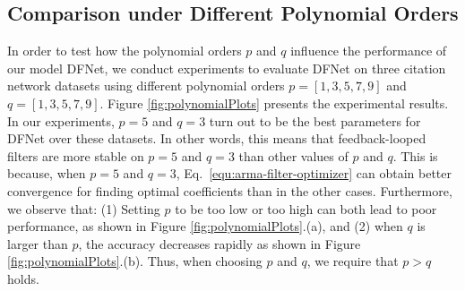 \documentclass{article}
\begin{document}
\begin{comment}
\begin{figure}[h]
    \centering
    \fbox{\texttt{[image: images/cut-off\_plots/ARMA-Dense.png]}}
    \fbox{\texttt{[image: images/cut-off\_plots/ARMA-DenseATT.png]}}
    \fbox{\texttt{[image: images/cut-off\_plots/ARMA-ATT.png]}}
    \caption{Accuracy fluctuation for each cut-off values on Cora, Citeseer, and Pubmed datasets for ARMA-Dense, ARMA-DenseATT, and ARMA-ATT models.}
    \label{fig:coraEmbeddings}
\end{figure}
\end{comment}

\subsection{Comparison under Different Polynomial Orders} \label{subsec:other-hyperparameters}

\begin{comment}
\begin{wrapfigure}[12]{r}{0.5\textwidth}
\vspace{-0.3cm}
\centering\vspace{-0.2cm}
\texttt{[image: images/polynomial\_orders\_plot/poly\_v1.png]}
\caption{Accuracy (\%) of DFNet under different polynomial orders $p$ and $q$.
    \label{fig:polynomialPlots}}
\end{wrapfigure}
\end{comment}

In order to test how the polynomial orders $p$ and $q$ influence the performance of our model DFNet, we conduct experiments to evaluate DFNet on three citation network datasets using different polynomial orders $p=[1,3,5,7,9]$ and $q=[1,3,5,7,9]$.
    Figure \ref{fig:polynomialPlots} presents the experimental results. In our experiments, $p=5$ and $q=3$ turn out to be the best parameters for DFNet over these datasets. In other words, this means that feedback-looped filters are more stable on $p=5$ and $q=3$ than other values of $p$ and $q$. This is because, when $p=5$ and $q=3$, Eq.~\ref{equ:arma-filter-optimizer} can obtain better convergence for finding optimal coefficients than in the other cases. Furthermore, we observe that: (1) Setting $p$ to be too low or too high can both lead to poor performance, as shown in Figure \ref{fig:polynomialPlots}.(a), and (2) when $q$ is larger than $p$, the accuracy decreases rapidly as shown in Figure \ref{fig:polynomialPlots}.(b). Thus, when choosing $p$ and $q$, we require that $p>q$ holds.
\end{document}
